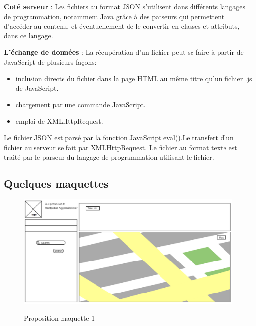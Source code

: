\textbf{Coté serveur }: Les fichiers au format JSON s'utilisent dans différents langages de programmation, notamment Java grâce à des parseurs qui permettent d'accéder au contenu, et éventuellement de le convertir en classes et attributs, dans ce langage.

\textbf{L'échange de données }: La récupération d'un fichier peut se faire à partir de JavaScript de plusieurs façons:
\begin{itemize}

\item inclusion directe du fichier dans la page HTML au même titre qu'un fichier .js de JavaScript.
\item chargement par une commande JavaScript.
\item emploi de XMLHttpRequest.


\end{itemize}
Le fichier JSON est parsé par la fonction JavaScript eval().Le transfert d'un fichier au serveur se fait par XMLHttpRequest. Le fichier au format texte est traité par le parseur du langage de programmation utilisant le fichier.


\subsection{Quelques maquettes}

\begin{center}
\begin{figure}[H] \centering
\includegraphics[width=17cm]{maquette_1.png}\\
\caption{\label{archi2} Proposition maquette 1}
\end{figure}
\end{center}

